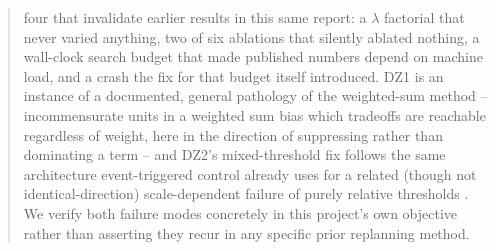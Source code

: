 \documentclass[11pt]{article}
\begin{document}
\begin{abstract}
four that invalidate earlier results in this same report: a $\lambda$
factorial that never varied anything, two of six ablations that silently
ablated nothing, a wall-clock search budget that made published numbers
depend on machine load, and a crash the fix for that budget itself
introduced. DZ1 is an instance of a documented, general pathology
of the weighted-sum method -- incommensurate units in a weighted sum bias
which tradeoffs are reachable regardless of weight, here in the direction
of suppressing rather than dominating a term \cite{marler2010} -- and DZ2's
mixed-threshold fix follows the same architecture event-triggered control
already uses for a related (though not identical-direction) scale-dependent
failure of purely relative thresholds \cite{yaqoob2022}. We verify both
failure modes concretely in this project's own objective rather than
asserting they recur in any specific prior replanning method.


\end{abstract}
\end{document}
